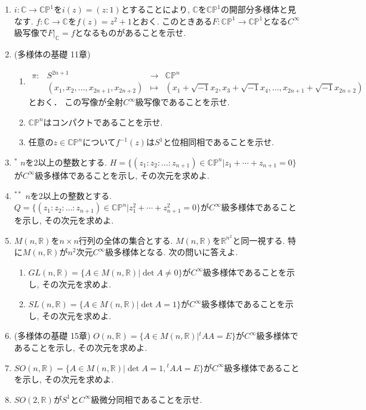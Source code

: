 \documentclass[dvipdfmx,a4paper,11pt]{article}
\newcommand{\R}{\mathbb{R}}
\newcommand{\C}{\mathbb{C}}
\theoremstyle{definition}
\begin{document}
\begin{enumerate}[label=\textbf{問}1.\arabic*]
\item $i :\C \rightarrow \C\mathbb{P}^{1}$を$i(z) = (z:1)$とすることにより, $\C$を$\C\mathbb{P}^{1}$の開部分多様体と見なす.  $f : \C \rightarrow \C$を$f(z) = z^2 +1$とおく. このときある$F : \C\mathbb{P}^{1} \rightarrow \C\mathbb{P}^1$となる$C^{\infty}$級写像で$F|_{\C} = f$となるものがあることを示せ. 
\item (多様体の基礎 11章)
	\begin{enumerate}
	\item  
	$$
\begin{array}{ccccc}
\pi: &S^{2n+1}& \rightarrow & \C\mathbb{P}^{n} & \\
&(x_1, x_2, \ldots, x_{2n+1}, x_{2n+2}) & \longmapsto &(x_1 + \sqrt{-1}x_2, x_3 + \sqrt{-1}x_4,\ldots, x_{2n+1}+ \sqrt{-1}x_{2n+2})&
\end{array}
$$
とおく． この写像が全射$C^{\infty}$級写像であることを示せ.
\item $\C\mathbb{P}^{n} $はコンパクトであることを示せ. 
	\item 任意の$z \in \C\mathbb{P}^{n}$について$f^{-1}(z)$は$S^{1}$と位相同相であることを示せ.
	\end{enumerate}

\item $^{*}$ $n$を2以上の整数とする. $H = \{ (z_{1}:z_{2}: \ldots : z_{n+1}) \in  \C\mathbb{P}^{n} |  z_{1} + \cdots+ z_{n+1} =0\}$が$C^{\infty}$級多様体であることを示し, その次元を求めよ.

\item $^{**}$ $n$を2以上の整数とする. $Q= \{ (z_{1}:z_{2}: \ldots : z_{n+1}) \in \C\mathbb{P}^{n} |  z_{1}^{2} + \cdots +z_{n+1}^{2} =0\}$が$C^{\infty}$級多様体であることを示し, その次元を求めよ.


\item $M(n,\R)$を$n\times n$行列の全体の集合とする.  $M(n,\R)$を$\R^{n^2}$と同一視する. 特に$M(n,\R)$が$n^2$次元$C^{\infty}$級多様体となる. 次の問いに答えよ.
	\begin{enumerate}
	\item $GL(n, \R) = \{ A \in M(n,\R) | \det A \neq 0\}$が$C^{\infty}$級多様体であることを示し, その次元を求めよ. 
	\item $SL(n, \R) = \{ A \in M(n,\R) | \det A =1\}$が$C^{\infty}$級多様体であることを示し, その次元を求めよ. 
	\end{enumerate}
\item  (多様体の基礎 15章) $O(n, \R) = \{ A \in M(n,\R) | {}^{t}AA =E\}$が$C^{\infty}$級多様体であることを示し, その次元を求めよ. 
	\item  $SO(n, \R) = \{ A \in M(n,\R) | \det A =1, {}^{t}AA =E\}$が$C^{\infty}$級多様体であることを示し, その次元を求めよ. 
	\item $SO(2, \R) $が$S^1$と$C^{\infty}$級微分同相であることを示せ. 
	

\end{enumerate}
\end{document}
